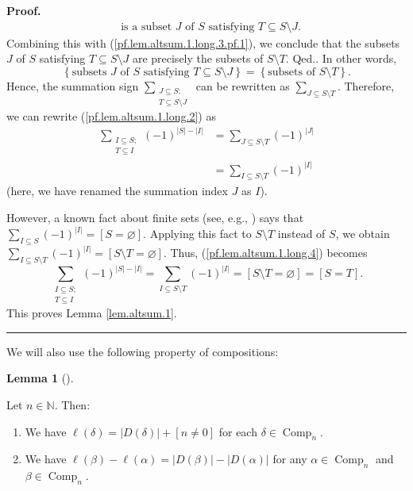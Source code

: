 \documentclass[numbers=enddot,12pt,final,onecolumn,notitlepage]{scrartcl}%
\theoremstyle{definition}
\newtheorem{lem}[theo]{Lemma}
\newenvironment{lemma}[1][]
{\begin{lem}[#1]\begin{leftbar}}
{\end{leftbar}\end{lem}}
\newenvironment{proof}[1][Proof]{\noindent\textbf{#1.} }{\ \rule{0.5em}{0.5em}}
\let\sumnonlimits\sum
\renewcommand{\sum}{\sumnonlimits\limits}
\newenvironment{verlong}{}{}
\begin{document}
\begin{verlong}
\begin{proof}
{\begin{align*}
&  \text{is a subset }J\text{ of }S\text{ satisfying }T\subseteq S\setminus J.
\end{align*}
Combining this with (\ref{pf.lem.altsum.1.long.3.pf.1}), we conclude that the
subsets $J$ of $S$ satisfying $T\subseteq S\setminus J$ are precisely the
subsets of $S\setminus T$. Qed.}. In other words,%
\[
\left\{  \text{subsets }J\text{ of }S\text{ satisfying }T\subseteq S\setminus
J\right\}  =\left\{  \text{subsets of }S\setminus T\right\}  .
\]
Hence, the summation sign $\sum_{\substack{J\subseteq S;\\T\subseteq
S\setminus J}}$ can be rewritten as $\sum_{J\subseteq S\setminus T}$.
Therefore, we can rewrite (\ref{pf.lem.altsum.1.long.2}) as%
\begin{align}
\sum_{\substack{I\subseteq S;\\T\subseteq I}}\left(  -1\right)  ^{\left\vert
S\right\vert -\left\vert I\right\vert }  &  =\sum_{J\subseteq S\setminus
T}\left(  -1\right)  ^{\left\vert J\right\vert }\nonumber\\
&  =\sum_{I\subseteq S\setminus T}\left(  -1\right)  ^{\left\vert I\right\vert
} \label{pf.lem.altsum.1.long.4}%
\end{align}
(here, we have renamed the summation index $J$ as $I$).

However, a known fact about finite sets (see, e.g., \cite[Proposition
2.9.10]{Grinbe20}) says that $\sum_{I\subseteq S}\left(  -1\right)
^{\left\vert I\right\vert }=\left[  S=\varnothing\right]  $. Applying this
fact to $S\setminus T$ instead of $S$, we obtain $\sum_{I\subseteq S\setminus
T}\left(  -1\right)  ^{\left\vert I\right\vert }=\left[  S\setminus
T=\varnothing\right]  $. Thus, (\ref{pf.lem.altsum.1.long.4}) becomes%
\[
\sum_{\substack{I\subseteq S;\\T\subseteq I}}\left(  -1\right)  ^{\left\vert
S\right\vert -\left\vert I\right\vert }=\sum_{I\subseteq S\setminus T}\left(
-1\right)  ^{\left\vert I\right\vert }=\left[  S\setminus T=\varnothing
\right]  =\left[  S=T\right]  .
\]
This proves Lemma \ref{lem.altsum.1}.
\end{proof}
\end{verlong}

We will also use the following property of compositions:

\begin{lemma}
\label{lem.comps.l-vs-size}Let $n\in\mathbb{N}$. Then:

\begin{enumerate}
\item[\textbf{(a)}] We have $\ell\left(  \delta\right)  =\left\vert D\left(
\delta\right)  \right\vert +\left[  n\neq0\right]  $ for each $\delta
\in\operatorname*{Comp}\nolimits_{n}$.

\item[\textbf{(b)}] We have $\ell\left(  \beta\right)  -\ell\left(
\alpha\right)  =\left\vert D\left(  \beta\right)  \right\vert -\left\vert
D\left(  \alpha\right)  \right\vert $ for any $\alpha\in\operatorname*{Comp}%
\nolimits_{n}$ and $\beta\in\operatorname*{Comp}\nolimits_{n}$.
\end{enumerate}
\end{lemma}
\end{document}
